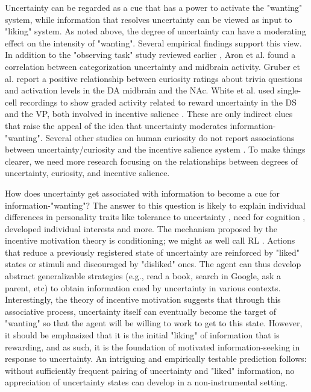 Uncertainty can be regarded as a cue that has a power to activate the "wanting" system, while information that resolves uncertainty can be viewed as input to "liking" system. As noted above, the degree of uncertainty can have a moderating effect on the intensity of "wanting". Several empirical findings support this view. In addition to the "observing task" study reviewed earlier \cite{bromberg-martin_midbrain_2009}, Aron et al. \cite{aron_human_2004} found a correlation between categorization uncertainty and midbrain activity. Gruber et al. \cite{gruber_states_2014} report a positive relationship between curiosity ratings about trivia questions and activation levels in the \ac{DA} midbrain and the \ac{NAc}. White et al. \cite{white_neural_2019} used single-cell recordings to show graded activity related to reward uncertainty in the \ac{DS} and the \ac{VP}, both involved in incentive salience \cite{smith_ventral_2009,volkow_nonhedonic_2002}. These are only indirect clues that raise the appeal of the idea that uncertainty moderates information-"wanting". Several other studies on human curiosity do not report associations between uncertainty/curiosity and the incentive salience system \cite{kang_wick_2009,jepma_neural_2012,van_lieshout_induction_2018}. To make things clearer, we need more research focusing on the relationships between degrees of uncertainty, curiosity, and incentive salience.

How does uncertainty get associated with information to become a cue for information-"wanting"? The answer to this question is likely to explain individual differences in personality traits like tolerance to uncertainty \cite{hillen_tolerance_2017}, need for cognition \cite{cacioppo_need_1982}, developed individual interests \cite{hidi_four-phase_2006} and more. The mechanism proposed by the incentive motivation theory is conditioning; we might as well call \ac{RL} \cite{maia_reinforcement_2009}. Actions that reduce a previously registered state of uncertainty are reinforced by "liked" states or stimuli and discouraged by "disliked" ones. The agent can thus develop abstract generalizable strategies (e.g., read a book, search in Google, ask a parent, etc) to obtain information cued by uncertainty in various contexts. Interestingly, the theory of incentive motivation suggests that through this associative process, uncertainty itself can eventually become the target of "wanting" so that the agent will be willing to work to get to this state. However, it should be emphasized that it is the initial "liking" of information that is rewarding, and as such, it is the foundation of motivated information-seeking in response to uncertainty. An intriguing and empirically testable prediction follows: without sufficiently frequent pairing of uncertainty and "liked" information, no appreciation of uncertainty states can develop in a non-instrumental setting.

